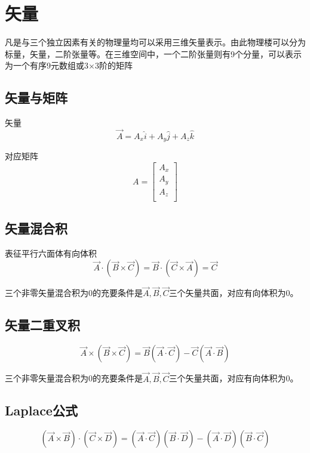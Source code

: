 \chapter{矢量}

凡是与三个独立因素有关的物理量均可以采用三维矢量表示。由此物理楼可以分为标量，矢量，二阶张量等。在三维空间中，一个二阶张量则有9个分量，可以表示为一个有序9元数组或3×3阶的矩阵


\section{矢量与矩阵}

矢量
\[\overrightarrow{A}=A_x\widehat{i}+A_y\widehat{j}+A_z\widehat{k}\]


\noindent	对应矩阵
\[A=\left[ \begin{array}{c}
A_x\\
A_y\\
A_z\\
\end{array} \right] \]



\section{矢量混合积}
表征平行六面体有向体积
\[
\vec{A}\cdot \left( \vec{B}\times \vec{C} \right) =\vec{B}\cdot \left( \vec{C}\times \vec{A} \right) =\vec{C}
\]

\begin{newdef}[]
	三个非零矢量混合积为0的充要条件是$\vec{A},\vec{B},\vec{C}$三个矢量共面，对应有向体积为0。
\end{newdef}




\section{矢量二重叉积}	
\[
\vec{A}\times \left( \vec{B}\times \vec{C} \right) =\vec{B}\left( \vec{A}\cdot \vec{C} \right) -\vec{C}\left( \vec{A}\cdot \vec{B} \right) 
\]
\begin{newdef}[]
	三个非零矢量混合积为0的充要条件是$\vec{A},\vec{B},\vec{C}$三个矢量共面，对应有向体积为0。
\end{newdef}


\section{Laplace公式}
\[
\left( \vec{A}\times \vec{B} \right) \cdot \left( \vec{C}\times \vec{D} \right) =\left( \vec{A}\cdot \vec{C} \right) \left( \vec{B}\cdot \vec{D} \right) -\left( \vec{A}\cdot \vec{D} \right) \left( \vec{B}\cdot \vec{C} \right) 
\]


